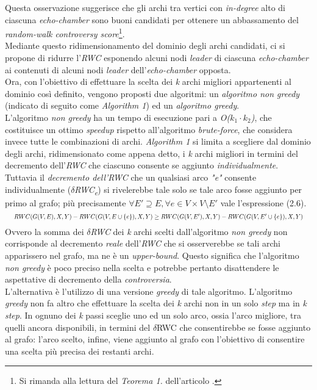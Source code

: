 Questa osservazione suggerisce che gli archi tra vertici con \textit{in-degree} alto di ciascuna \textit{echo-chamber} sono buoni candidati per ottenere un abbassamento del \textit{random-walk controversy score}\footnote{Si rimanda alla lettura del \textit{Teorema 1.} dell'articolo \cite{garimella:paper}.}. 
\\Mediante questo ridimensionamento del dominio degli archi candidati, ci si propone di ridurre l'\textit{RWC} esponendo alcuni nodi \textit{leader} di ciascuna \textit{echo-chamber} ai contenuti di alcuni nodi \textit{leader} dell'\textit{echo-chamber} opposta. 
\\Ora, con l'obiettivo di effettuare la scelta dei \textit{k} archi migliori appartenenti al dominio così definito, vengono proposti due algoritmi: un \textit{algoritmo non greedy} (indicato di seguito come \textit{Algorithm 1}) ed un \textit{algoritmo greedy}.
\\L'algoritmo \textit{non greedy} ha un tempo di esecuzione pari a \textit{O($k_1 \cdot k_2$)}, che costituisce un ottimo \textit{speedup} rispetto all'algoritmo \textit{brute-force}, che considera invece tutte le combinazioni di archi. \textit{Algorithm 1} si limita a scegliere dal dominio degli archi, ridimensionato come appena detto, i \textit{k} archi migliori in termini del decremento dell'\textit{RWC} che ciascuno consente se aggiunto \textit{individualmente}. Tuttavia il \textit{decremento dell'RWC} che un qualsiasi arco \textit{"e"} consente individualmente (\textit{$\delta$RWC\textsubscript{e}}) si rivelerebbe tale solo se tale arco fosse aggiunto per primo al grafo; più precisamente $\forall E' \supseteq E, \forall e \in V \times V \setminus E'$ vale l'espressione (2.6). 
\begin{equation}
\resizebox{1 \textwidth}{!} 
{
    $ RWC(G(V,E),X,Y) - RWC(G(V, E \cup \{e\}),X,Y) \geq RWC(G(V,E'),X,Y) - RWC(G(V, E' \cup \{e\}),X,Y)$
} 
\end{equation}
Ovvero la somma dei \textit{$\delta$RWC} dei \textit{k} archi scelti dall'algoritmo \textit{non greedy} non corrisponde al decremento \textit{reale} dell'\textit{RWC} che si osserverebbe se tali archi apparissero nel grafo, ma ne è un \textit{upper-bound}. Questo significa che l'algoritmo \textit{non greedy} è poco preciso nella scelta e potrebbe pertanto disattendere le aspettative di decremento della \textit{controversia}.
\\L'alternativa è l'utilizzo di una versione \textit{greedy} di tale algoritmo. L'algoritmo \textit{greedy} non fa altro che effettuare la scelta dei \textit{k} archi non in un solo \textit{step} ma in \textit{k step}. In ognuno dei \textit{k} passi sceglie uno ed un solo arco, ossia l'arco migliore, tra quelli ancora disponibili, in termini del $\delta$RWC che consentirebbe se fosse aggiunto al grafo: l'arco scelto, infine, viene aggiunto al grafo con l'obiettivo di consentire una scelta più precisa dei restanti archi.

